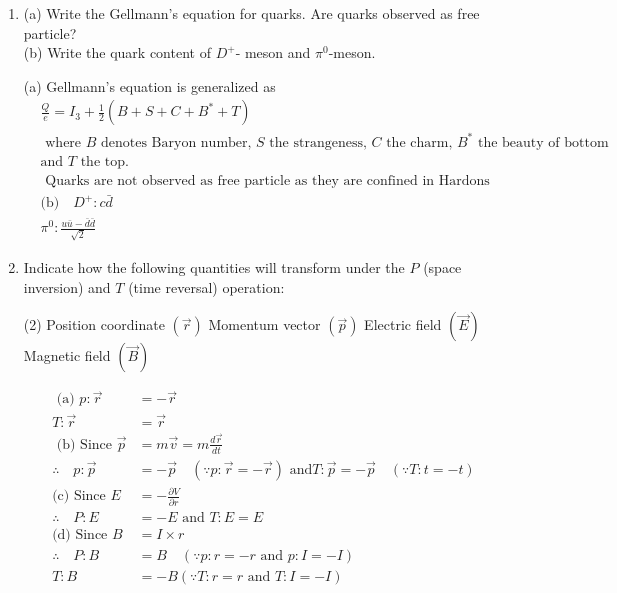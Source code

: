 \begin{enumerate}
\begin{tasks}
		\task[\textbf{d.}] $\Lambda \rightarrow \pi^{+}+e^{-}+\bar{v}_e$
	\end{tasks}
	\begin{answer}
(a) Forbidden because Lepton number is not conserved\\
	(b) Forbidden because charge is not conserved\\
	(c) Allowed\\
	(d) Allowed
\end{answer}
	\item (a) Write the Gellmann's equation for quarks. Are quarks observed as free particle?\\
	(b) Write the quark content of $D^{+}$- meson and $\pi^0$-meson.
		\begin{answer}
				(a) Gellmann's equation is generalized as
		\begin{align*}
		&\frac{Q}{e}=I_3+\frac{1}{2}\left(B+S+C+B^*+T\right)\\
	&\text{	where $B$ denotes Baryon number, $S$ the strangeness, $C$ the charm, $B^*$ the beauty of bottom }\\
	&\text{and $T$ the top.}\\
	&\text{	Quarks are not observed as free particle as they are confined in Hardons}\\
	&\text{(b)}\quad  D^{+}: c \bar{d}\\
	&\pi^0: \frac{u \bar{u}-\bar{d} \bar{d}}{\sqrt{2}}
		\end{align*}
	\end{answer}
	\item Indicate how the following quantities will transform under the $P$ (space inversion) and $T$ (time reversal) operation:
	 \begin{tasks}(2)
		\task[\textbf{a.}] Position coordinate $(\vec{r})$
		\task[\textbf{b.}] Momentum vector $(\vec{p})$
		\task[\textbf{c.}] Electric field $(\vec{E})$
		\task[\textbf{d.}] Magnetic field $(\vec{B})$
	\end{tasks}
		\begin{answer}
		\begin{align*}
		\text { (a) } p: \vec{r}&=-\vec{r}\\
		T: \vec{r}&=\vec{r}\\
	\text{	(b) Since }\vec{p}&=m \vec{v}=m \frac{d \vec{r}}{d t}\\
		\therefore \quad  p: \vec{p}&=-\vec{p} \quad(\because p: \vec{r}=-\vec{r})\text{ and} T: \vec{p}=-\vec{p} \quad(\because T: t=-t)\\
		\text{(c) Since }E&=-\frac{\partial V}{\partial r}\\
		\therefore \quad P: E&=-E \text{ and }T: E=E\\
		\text{(d) Since }B&=I \times r\\
		\therefore\quad  P: B&=B \quad(\because p: r=-r\text{ and }p: I=-I)\\
		T: B&=-B(\because T: r=r\text{ and }T: I=-I)
		\end{align*}
	\end{answer}
	
	
	
	
	
	
	
	
	
	
	
\end{enumerate}